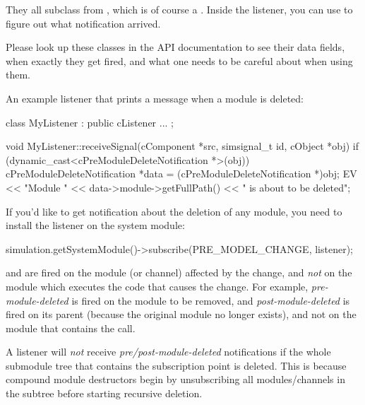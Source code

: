 They all subclass from , which is of course a
. Inside the listener, you can use  to figure
out what notification arrived.

\begin{note}
  Please look up these classes in the API documentation to see their data fields,
  when exactly they get fired, and what one needs to be careful about when using them.
\end{note}

An example listener that prints a message when a module is deleted:

\begin{cpp}
class MyListener : public cListener
{
   ...
};

void MyListener::receiveSignal(cComponent *src, simsignal_t id, cObject *obj)
{
    if (dynamic_cast<cPreModuleDeleteNotification *>(obj))
    {
        cPreModuleDeleteNotification *data = (cPreModuleDeleteNotification *)obj;
        EV << "Module " << data->module->getFullPath() << " is about to be deleted\n";
    }
}
\end{cpp}

If you'd like to get notification about the deletion of any module, you need
to install the listener on the system module:

\begin{cpp}
simulation.getSystemModule()->subscribe(PRE_MODEL_CHANGE, listener);
\end{cpp}

\begin{note}
   and  are fired on the
  module (or channel) affected by the change, and \textit{not} on the module
  which executes the code that causes the change. For example,
  \textit{pre-module-deleted} is fired on the module to be removed, and
  \textit{post-module-deleted} is fired on its parent (because the original
  module no longer exists), and not on the module that contains the
   call.
\end{note}

\begin{note}
  A listener will \textit{not} receive \textit{pre/post-module-deleted}
  notifications if the whole submodule tree that contains the subscription
  point is deleted. This is because compound module destructors begin
  by unsubscribing all modules/channels in the subtree before starting
  recursive deletion.
\end{note}


